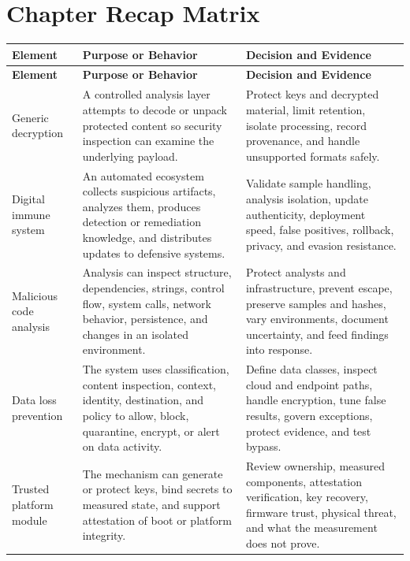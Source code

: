 \documentclass[11pt]{article}
\begin{document}
\section{Chapter Recap Matrix}
\begingroup\small\setlength{\tabcolsep}{4pt}
\begin{longtable}{@{}>{\RaggedRight\arraybackslash}p{}>{\RaggedRight\arraybackslash}p{}>{\RaggedRight\arraybackslash}p{}@{}}
\toprule\rowcolor{Navy}\color{white}\textbf{Element} & \color{white}\textbf{Purpose or Behavior} & \color{white}\textbf{Decision and Evidence}\\\midrule\endfirsthead
\toprule\rowcolor{Navy}\color{white}\textbf{Element} & \color{white}\textbf{Purpose or Behavior} & \color{white}\textbf{Decision and Evidence}\\\midrule\endhead
Generic decryption & A controlled analysis layer attempts to decode or unpack protected content so security inspection can examine the underlying payload. & Protect keys and decrypted material, limit retention, isolate processing, record provenance, and handle unsupported formats safely. \\\midrule
Digital immune system & An automated ecosystem collects suspicious artifacts, analyzes them, produces detection or remediation knowledge, and distributes updates to defensive systems. & Validate sample handling, analysis isolation, update authenticity, deployment speed, false positives, rollback, privacy, and evasion resistance. \\\midrule
Malicious code analysis & Analysis can inspect structure, dependencies, strings, control flow, system calls, network behavior, persistence, and changes in an isolated environment. & Protect analysts and infrastructure, prevent escape, preserve samples and hashes, vary environments, document uncertainty, and feed findings into response. \\\midrule
Data loss prevention & The system uses classification, content inspection, context, identity, destination, and policy to allow, block, quarantine, encrypt, or alert on data activity. & Define data classes, inspect cloud and endpoint paths, handle encryption, tune false results, govern exceptions, protect evidence, and test bypass. \\\midrule
Trusted platform module & The mechanism can generate or protect keys, bind secrets to measured state, and support attestation of boot or platform integrity. & Review ownership, measured components, attestation verification, key recovery, firmware trust, physical threat, and what the measurement does not prove. \\\midrule

\end{longtable}
\end{document}
